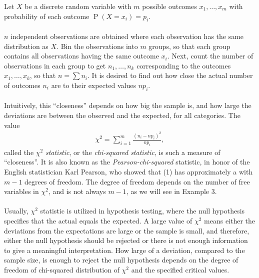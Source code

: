 \documentclass[12pt]{article}
\begin{document}
 
 
 
 

Let $X$ be a discrete random variable with $m$ possible outcomes
$x_1,\ldots,x_m$ with probability of each outcome
$\operatorname{P}(X=x_i)=p_i$.
\\\\
$n$ independent observations are obtained where each observation has
the same distribution as $X$. Bin the observations into $m$ groups,
so that each group contains all observations having the same outcome
$x_i$.  Next, count the number of observations in each group to get
$n_1,\ldots,n_k$ corresponding to the outcomes $x_1,\ldots,x_k$, so
that $n=\sum n_i$.  It is desired to find out how close the actual
number of outcomes $n_i$ are to their expected values $np_i$.
\\\\
Intuitively, this ``closeness'' depends on how big the sample is,
and how large the deviations are between the observed and the
expected, for all categories.  The value
\begin{eqnarray}
\chi^2=\sum_{i=1}^{m} \frac{(n_i-np_i)^2}{np_i},
\end{eqnarray}
called the $\chi^2$ \emph{statistic}, or the \emph{chi-squared
statistic}, is such a measure of ``closeness''.  It is also known as
the \emph{Pearson-chi-squared} statistic, in honor of the English
statistician Karl Pearson, who showed that (1) has approximately a
 with
$m-1$ degrees of freedom.  The degree of freedom depends on the
number of free variables in $\chi^2$, and is not always $m-1$, as we
will see in Example $3$.
\\\\
Usually, $\chi^2$ statistic is utilized in hypothesis testing, where
the null hypothesis specifies that the actual equals the expected. A
large value of $\chi^2$ means either the deviations from the
expectations are large or the sample is small, and therefore, either
the null hypothesis should be rejected or there is not enough
information to give a meaningful interpretation.  How large of a
deviation, compared to the sample size, is enough to reject the null
hypothesis depends on the degree of freedom of chi-squared
distribution of $\chi^2$ and the specified critical values.
\\\\
\end{document}
